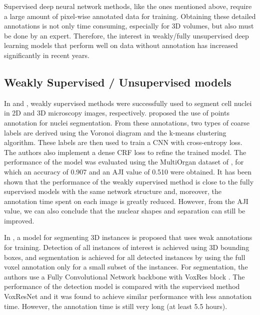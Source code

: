 Supervised deep neural network methods, like the ones mentioned above, require a large amount of pixel-wise annotated data for training. Obtaining these detailed annotations is not only time consuming, especially for \ac{3D} volumes, but also must be done by an expert. Therefore, the interest in weakly/fully unsupervised deep learning models that perform well on data without annotation has increased significantly in recent years.

\subsection{Weakly Supervised / Unsupervised models}

In \cite{weakly:2D} and \cite{weakly:3D}, weakly supervised methods were successfully used to segment cell nuclei in \ac{2D} and \ac{3D} microscopy images, respectively. \citet{weakly:2D} proposed the use of points annotation for nuclei segmentation. From these annotations, two types of coarse labels are derived using the Voronoi diagram and the k-means clustering algorithm. These labels are then used to train a \ac{CNN} with cross-entropy loss. The authors also implement a dense CRF loss to refine the trained model. The performance of the model was evaluated using the MultiOrgan dataset of \cite{CNN3}, for which an accuracy of 0.907 and an \ac{AJI} value of 0.510 were obtained. It has been shown that the performance of the weakly supervised method is close to the fully supervised models with the same network structure and, moreover, the annotation time spent on each image is greatly reduced. However, from the \ac{AJI} value, we can also conclude that the nuclear shapes and separation can still be improved.

In \cite{weakly:3D}, a model for segmenting \ac{3D} instances is proposed that uses weak annotations for training. Detection of all instances of interest is achieved using \ac{3D} bounding boxes, and segmentation is achieved for all detected instances by using the full voxel annotation only for a small subset of the instances. For segmentation, the authors use a Fully Convolutional Network backbone with VoxRes block \cite{voxresnet}. The performance of the detection model is compared with the supervised method VoxResNet \cite{voxresnet} and it was found to achieve similar performance with less annotation time. However, the annotation time is still very long (at least 5.5 hours).

